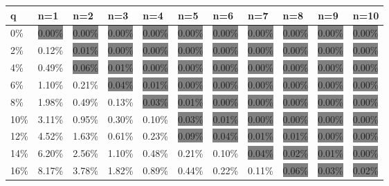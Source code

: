 \documentclass[letterpaper,12pt]{report}
\theoremstyle{plain}
\theoremstyle{definition}
\begin{document}
\newpage

\begin{table}
\resizebox{18cm}{!} {
    \begin{tabular}{l|llllllllll}
    q  & n=1     & n=2     & n=3     & n=4     & n=5     & n=6     & n=7     & n=8     & n=9     & n=10    \\ \hline
    0\% & \colorbox{gray}{0.00\%}  & \colorbox{gray}{0.00\%}  & \colorbox{gray}{0.00\%}  & \colorbox{gray}{0.00\%}  & \colorbox{gray}{0.00\%}  & \colorbox{gray}{0.00\%}  & \colorbox{gray}{0.00\%}  & \colorbox{gray}{0.00\%}  & \colorbox{gray}{0.00\%}  & \colorbox{gray}{0.00\%}  \\
    2\% & 0.12\%  & \colorbox{gray}{0.01\%}  & \colorbox{gray}{0.00\%}  & \colorbox{gray}{0.00\%}  & \colorbox{gray}{0.00\%}  & \colorbox{gray}{0.00\%}  & \colorbox{gray}{0.00\%}  & \colorbox{gray}{0.00\%}  & \colorbox{gray}{0.00\%}  & \colorbox{gray}{0.00\%}  \\
    4\% & 0.49\%  & \colorbox{gray}{0.06\%}  & \colorbox{gray}{0.01\%}  & \colorbox{gray}{0.00\%}  & \colorbox{gray}{0.00\%}  & \colorbox{gray}{0.00\%}  & \colorbox{gray}{0.00\%}  & \colorbox{gray}{0.00\%}  & \colorbox{gray}{0.00\%}  & \colorbox{gray}{0.00\%}  \\
    6\% & 1.10\%  & 0.21\%  & \colorbox{gray}{0.04\%}  & \colorbox{gray}{0.01\%}  & \colorbox{gray}{0.00\%}  & \colorbox{gray}{0.00\%}  & \colorbox{gray}{0.00\%}  & \colorbox{gray}{0.00\%}  & \colorbox{gray}{0.00\%}  & \colorbox{gray}{0.00\%}  \\
    8\% & 1.98\%  & 0.49\%  & 0.13\%  & \colorbox{gray}{0.03\%}  & \colorbox{gray}{0.01\%}  & \colorbox{gray}{0.00\%}  & \colorbox{gray}{0.00\%}  & \colorbox{gray}{0.00\%}  & \colorbox{gray}{0.00\%}  & \colorbox{gray}{0.00\%}  \\
    10\% & 3.11\%  & 0.95\%  & 0.30\%  & 0.10\%  & \colorbox{gray}{0.03\%}  & \colorbox{gray}{0.01\%}  & \colorbox{gray}{0.00\%}  & \colorbox{gray}{0.00\%}  & \colorbox{gray}{0.00\%}  & \colorbox{gray}{0.00\%}  \\
    12\% & 4.52\%  & 1.63\%  & 0.61\%  & 0.23\%  & \colorbox{gray}{0.09\%}  & \colorbox{gray}{0.04\%}  & \colorbox{gray}{0.01\%}  & \colorbox{gray}{0.01\%}  & \colorbox{gray}{0.00\%}  & \colorbox{gray}{0.00\%}  \\
    14\% & 6.20\%  & 2.56\%  & 1.10\%  & 0.48\%  & 0.21\%  & 0.10\%  & \colorbox{gray}{0.04\%}  & \colorbox{gray}{0.02\%}  & \colorbox{gray}{0.01\%}  & \colorbox{gray}{0.00\%}  \\
    16\% & 8.17\%  & 3.78\%  & 1.82\%  & 0.89\%  & 0.44\%  & 0.22\%  & 0.11\%  & \colorbox{gray}{0.06\%}  & \colorbox{gray}{0.03\%}  & \colorbox{gray}{0.02\%}  \\

\end{tabular}}
\end{table}
\end{document}
